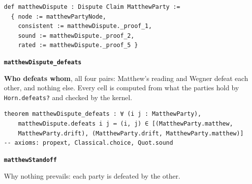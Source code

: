 \documentclass[11pt]{article}
\begin{document}
{\small\begin{verbatim}
def matthewDispute : Dispute Claim MatthewParty :=
  { node := matthewPartyNode,
    consistent := matthewDispute._proof_1,
    sound := matthewDispute._proof_2,
    rated := matthewDispute._proof_5 }
\end{verbatim}}
\par\medskip\noindent\textbf{\texttt{matthew\allowbreak{}Dispute\_\allowbreak{}defeats}}\par\nobreak\noindent
\textbf{Who defeats whom}, all four pairs: Matthew’s reading and Wegner defeat each other, and nothing else. Every cell is computed from what the parties hold by \texttt{Horn.defeats?} and checked by the kernel.

{\small\begin{verbatim}
theorem matthewDispute_defeats : ∀ (i j : MatthewParty),
    matthewDispute.defeats i j ↔ (i, j) ∈ [(MatthewParty.matthew,
    MatthewParty.drift), (MatthewParty.drift, MatthewParty.matthew)]
-- axioms: propext, Classical.choice, Quot.sound
\end{verbatim}}
\par\medskip\noindent\textbf{\texttt{matthew\allowbreak{}Standoff}}\par\nobreak\noindent
Why nothing prevails: each party is defeated by the other.
\end{document}
